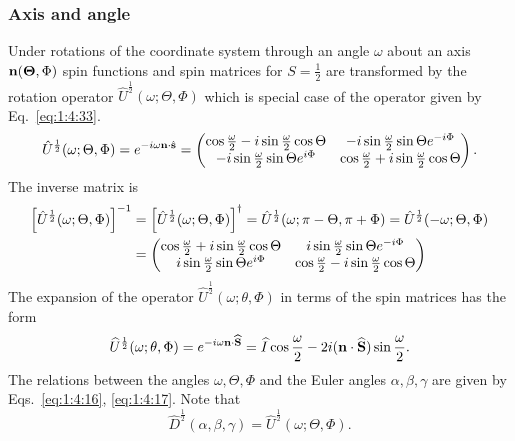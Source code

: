 \subsubsection{Axis and angle}
 Under rotations of the coordinate system through an angle $\omega$ about an axis $\mathbf{n}(\boldsymbol{\Theta}, \Phi)$ spin functions and spin matrices for $S=\frac{1}{2}$ are transformed by the rotation operator $\hat{U}^{\frac{1}{2}}(\omega ; \Theta, \Phi)$ which is special case of the operator given by Eq.~\eqref{eq:1:4:33}.
\begin{equation}
\hat{U}^{\frac{1}{2}}(\omega ; \Theta, \Phi)=e^{-i \omega \mathbf{n} \cdot \hat{\mathbf{s}}}=\begin{pmatrix}
\cos \frac{\omega}{2}-i \sin \frac{\omega}{2} \cos \Theta & -i \sin \frac{\omega}{2} \sin \Theta e^{-i \Phi}  \label{eq:2:5:36}\\
-i \sin \frac{\omega}{2} \sin \Theta e^{i \Phi} & \cos \frac{\omega}{2}+i \sin \frac{\omega}{2} \cos \Theta
\end{pmatrix} .
\end{equation}
The inverse matrix is
\begin{align}
{\left[\hat{U}^{\frac{1}{2}}(\omega ; \Theta, \Phi)\right]^{-1} } & =\left[\hat{U}^{\frac{1}{2}}(\omega ; \Theta, \Phi)\right]^{\dagger}=\hat{U}^{\frac{1}{2}}(\omega ; \pi-\Theta, \pi+\Phi)=\hat{U}^{\frac{1}{2}}(-\omega ; \Theta, \Phi)  \notag\\
& =\begin{pmatrix}
\cos \frac{\omega}{2}+i \sin \frac{\omega}{2} \cos \Theta & i \sin \frac{\omega}{2} \sin \Theta e^{-i \Phi} \\
i \sin \frac{\omega}{2} \sin \Theta e^{i \Phi} & \cos \frac{\omega}{2}-i \sin \frac{\omega}{2} \cos \Theta
\end{pmatrix} \label{eq:2:5:37}
\end{align}
The expansion of the operator $\hat{U}^{\frac{1}{2}}(\omega ; \theta, \Phi)$ in terms of the spin matrices has the form
\begin{equation}
\widehat{U}^{\frac{1}{2}}(\omega ; \theta, \Phi)=e^{-i \omega \mathbf{n} \cdot \widehat{\mathbf{S}}}=\widehat{I} \cos \frac{\omega}{2}-2 i(\mathbf{n} \cdot \widehat{\mathbf{S}}) \sin \frac{\omega}{2}. \label{eq:2:5:38}
\end{equation}
The relations between the angles $\omega, \Theta, \Phi$ and the Euler angles $\alpha, \beta, \gamma$ are given by Eqs.~\eqref{eq:1:4:16}, \eqref{eq:1:4:17}. Note that
\begin{equation}
\hat{D}^{\frac{1}{2}}(\alpha, \beta, \gamma)=\hat{U}^{\frac{1}{2}}(\omega ; \Theta, \Phi) . \label{eq:2:5:39}
\end{equation}
